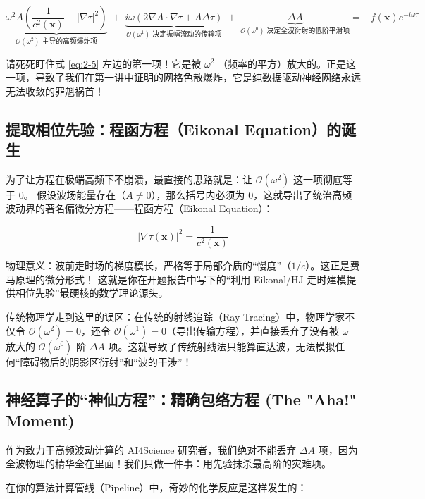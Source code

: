 \documentclass[12pt]{article}
\begin{document}
{\begin{equation}
\underbrace{\omega^2 A \left( \frac{1}{c^2(\mathbf{x})} - |\nabla \tau|^2 \right)}_{\mathcal{O}(\omega^2) \text{ 主导的高频爆炸项}}
\;+\;
\underbrace{i \omega \left( 2 \nabla A \cdot \nabla \tau + A \Delta \tau \right)}_{\mathcal{O}(\omega^1) \text{ 决定振幅流动的传输项}}
\;+\;
\underbrace{\Delta A}_{\mathcal{O}(\omega^0) \text{ 决定全波衍射的低阶平滑项}}
=
-f(\mathbf{x})e^{-i\omega \tau}
\label{eq:2-5}
\end{equation}

请死死盯住式 \eqref{eq:2-5} 左边的第一项！它是被 $\omega^2$ （频率的平方）放大的。正是这一项，导致了我们在第一讲中证明的网格色散爆炸，它是纯数据驱动神经网络永远无法收敛的罪魁祸首！

\subsection{提取相位先验：程函方程（Eikonal Equation）的诞生}

为了让方程在极端高频下不崩溃，最直接的思路就是：让 $\mathcal{O}(\omega^2)$ 这一项彻底等于 0。
假设波场能量存在（$A \neq 0$），那么括号内必须为 0，这就导出了统治高频波动界的著名偏微分方程——程函方程（Eikonal Equation）：

\begin{equation}
|\nabla \tau(\mathbf{x})|^2 = \frac{1}{c^2(\mathbf{x})}
\label{eq:2-6}
\end{equation}

物理意义：波前走时场的梯度模长，严格等于局部介质的“慢度”（$1/c$）。这正是费马原理的微分形式！
这就是你在开题报告中写下的“利用 Eikonal/HJ 走时建模提供相位先验”最硬核的数学理论源头。

传统物理学走到这里的误区：在传统的射线追踪（Ray Tracing）中，物理学家不仅令 $\mathcal{O}(\omega^2)=0$，还令 $\mathcal{O}(\omega^1)=0$（导出传输方程），并直接丢弃了没有被 $\omega$ 放大的 $\mathcal{O}(\omega^0)$ 阶 $\Delta A$ 项。这就导致了传统射线法只能算直达波，无法模拟任何“障碍物后的阴影区衍射”和“波的干涉”！

\subsection{神经算子的“神仙方程”：精确包络方程 (The "Aha!" Moment)}

作为致力于高频波动计算的 AI4Science 研究者，我们绝对不能丢弃 $\Delta A$ 项，因为全波物理的精华全在里面！我们只做一件事：用先验抹杀最高阶的灾难项。

在你的算法计算管线（Pipeline）中，奇妙的化学反应是这样发生的：

}
\end{document}
